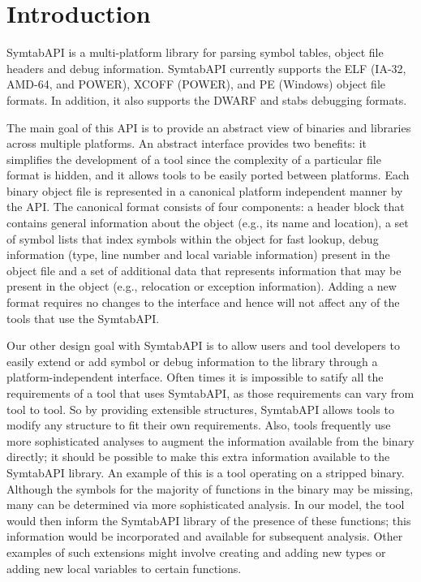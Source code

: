 \section{Introduction}
\label{sec:intro}

SymtabAPI is a multi-platform library for parsing symbol tables,
object file headers and debug information. SymtabAPI currently
supports the ELF (IA-32, AMD-64, and POWER), XCOFF (POWER), and PE
(Windows) object file formats. In addition, it also supports the DWARF
and stabs debugging formats.

The main goal of this API is to provide an abstract view of binaries and
libraries across multiple platforms. An abstract interface provides two
benefits: it simplifies the development of a tool since the complexity of a
particular file format is hidden, and it allows tools to be easily ported
between platforms. Each binary object file is represented in a canonical
platform independent manner by the API. The canonical format consists of four
components: a header block that contains general information about the object
(e.g., its name and location), a set of symbol lists that index symbols within
the object for fast lookup, debug information (type, line number and local
variable information) present in the object file and a set of additional data
that represents information that may be present in the object (e.g., relocation
or exception information). Adding a new format requires no changes to the
interface and hence will not affect any of the tools that use the SymtabAPI. 

Our other design goal with SymtabAPI is to allow users and tool developers to
easily extend or add symbol or debug information to the library through a
platform-independent interface. Often times it is impossible to satify all the
requirements of a tool that uses SymtabAPI, as those requirements can vary from
tool to tool. So by providing extensible structures, SymtabAPI allows tools to
modify any structure to fit their own requirements. Also, tools frequently use
more sophisticated analyses to augment the information available from the binary
directly; it should be possible to make this extra information available to the
SymtabAPI library. An example of this is a tool operating on a stripped binary.
Although the symbols for the majority of functions in the binary may be missing,
many can be determined via more sophisticated analysis. In our model, the tool
would then inform the SymtabAPI library of the presence of these functions; this
information would be incorporated and available for subsequent analysis. Other
examples of such extensions might involve creating and adding new types or
adding new local variables to certain functions.

